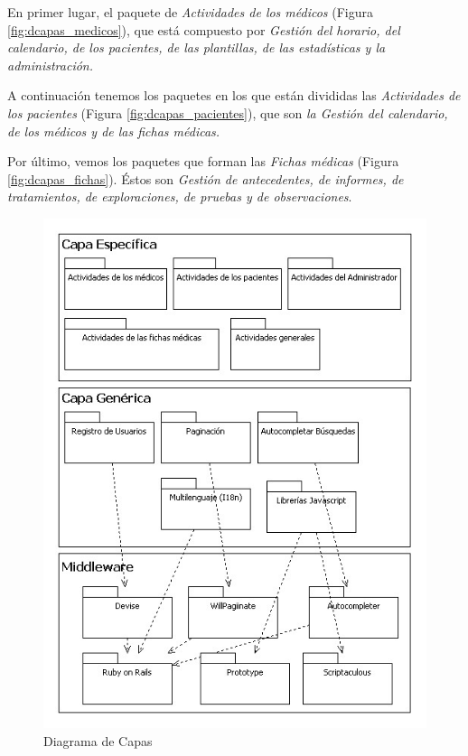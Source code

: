 		En primer lugar, el paquete de \textit{Actividades de los médicos} (Figura \ref{fig:dcapas_medicos}), que está compuesto por \textit{Gestión del horario, del calendario, de los pacientes, de las plantillas, de las estadísticas y la administración.}

		A continuación tenemos los paquetes en los que están divididas las \textit{Actividades de los pacientes} (Figura \ref{fig:dcapas_pacientes}), que son \textit{la Gestión del calendario, de los médicos y de las fichas médicas.}

		Por último, vemos los paquetes que forman las \textit{Fichas médicas} (Figura \ref{fig:dcapas_fichas}). Éstos son \textit{Gestión de antecedentes, de informes, de tratamientos, de exploraciones, de pruebas y de observaciones}.

		\begin{figure}[H]
		  \centering
		    \includegraphics[width=16cm]{img/jpg/dcapas/capas.jpg}
		  \caption{Diagrama de Capas}
		  \label{fig:dcapas}
		\end{figure}



